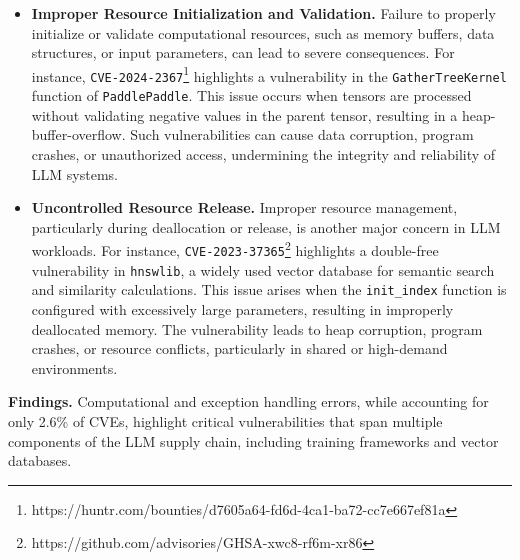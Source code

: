 \begin{itemize}[leftmargin=10pt] 
    \item \textbf{Improper Resource Initialization and Validation.}  
    Failure to properly initialize or validate computational resources, such as memory buffers, data structures, or input parameters, can lead to severe consequences. For instance, \texttt{CVE-2024-2367}\footnote{https://huntr.com/bounties/d7605a64-fd6d-4ca1-ba72-cc7e667ef81a} highlights a vulnerability in the \texttt{GatherTreeKernel} function of \texttt{PaddlePaddle}. This issue occurs when tensors are processed without validating negative values in the parent tensor, resulting in a heap-buffer-overflow. Such vulnerabilities can cause data corruption, program crashes, or unauthorized access, undermining the integrity and reliability of LLM systems.
    
    \item \textbf{Uncontrolled Resource Release.} Improper resource management, particularly during deallocation or release, is another major concern in LLM workloads. For instance, \texttt{CVE-2023-37365}\footnote{https://github.com/advisories/GHSA-xwc8-rf6m-xr86} highlights a double-free vulnerability in \texttt{hnswlib}, a widely used vector database for semantic search and similarity calculations. This issue arises when the \texttt{init\_index} function is configured with excessively large parameters, resulting in improperly deallocated memory. The vulnerability leads to heap corruption, program crashes, or resource conflicts, particularly in shared or high-demand environments. 
\end{itemize}

\begin{tcolorbox}  
    \textbf{Findings.} Computational and exception handling errors, while accounting for only 2.6\% of CVEs, highlight critical vulnerabilities that span multiple components of the LLM supply chain, including training frameworks and vector databases. 
\end{tcolorbox}


